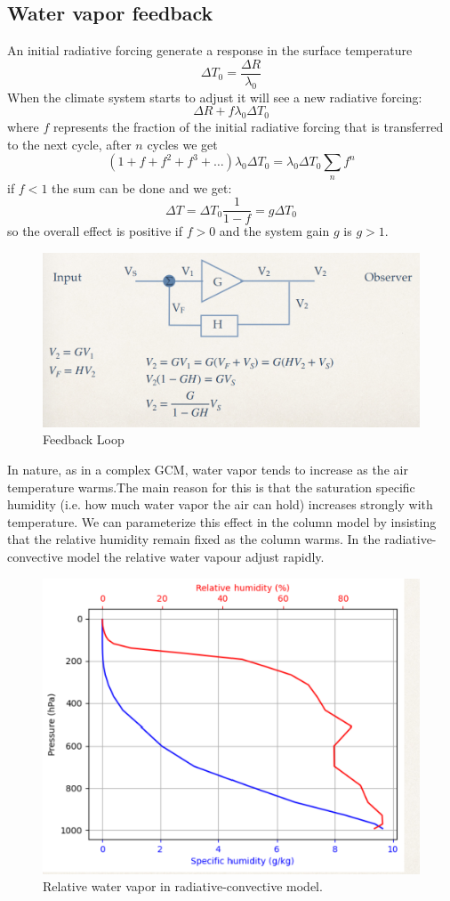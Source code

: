 \subsection{Water vapor feedback}
An initial radiative forcing generate a response in the surface temperature
\begin{equation}
	\Delta T_0=\frac{\Delta R}{\lambda_0}
\end{equation}
When the climate system starts to adjust it will see a new radiative forcing:
$$\Delta R+f\lambda_0\Delta T_0$$
where $f$ represents the  fraction of the initial radiative forcing that is transferred to the next cycle, after $n$ cycles we get
$$(1+f+f^2+f^3+\dots)\lambda_0\Delta T_0=\lambda_0\Delta T_0\sum_nf^n$$
if $f<1$ the sum can be done and we get: $$\Delta T=\Delta T_0\frac{1}{1-f}=g\Delta T_0$$
so the overall effect is positive if $f>0$ and the system gain $g$ is $g>1$.
\begin{figure}
	\centering
	\includegraphics[width=0.5\linewidth]{uploads/13676.png}
	\caption{Feedback Loop}
	\label{fig:enter-label}
\end{figure}
In nature, as in a complex GCM, water vapor tends to increase as the air temperature warms.The main reason for this is that the saturation specific humidity (i.e. how much water vapor the air can hold) increases strongly with temperature. We can parameterize this effect in the column model by insisting that the relative humidity remain fixed as the column warms. In the radiative-convective model the relative water vapour adjust rapidly.
\begin{figure}[h!]
	\centering
	\includegraphics[width=0.5\linewidth]{uploads/image112.png}
	\caption{Relative water vapor in radiative-convective model.}
	\label{fig:enter-label}
\end{figure}
